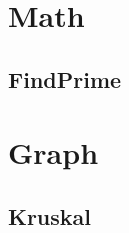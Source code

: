 \section{Math}
    \subsection{FindPrime}
        
\section{Graph}
    \subsection{Kruskal}
        
